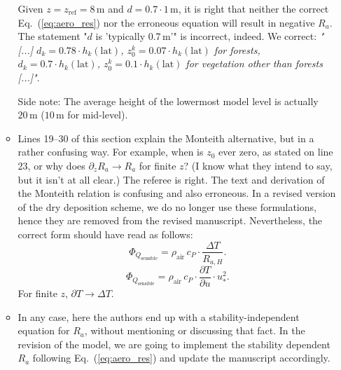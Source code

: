 \begin{itemize}
\begin{itemize}
  Given $z = z_\mathrm{ref} = 8\,\mathrm{m}$ and $d = 0.7\cdot 1\,\mathrm{m}$, it is right that neither the correct Eq.~(\ref{eq:aero_res}) nor the erroneous equation will result in negative $R_a$. The statement "$d$ is ’typically 0.7\,m’" is incorrect, indeed. We correct: \emph{"[...] $d_k=0.78\cdot h_k(\mathrm{lat})$, $z_0^k=0.07\cdot h_k(\mathrm{lat})$ for forests, $d_k=0.7\cdot h_k(\mathrm{lat})$, $z_0^k=0.1\cdot h_k(\mathrm{lat})$ for vegetation other than forests [...]"}.

  Side note: The average height of the lowermost model level is actually $20\,\mathrm{m}$ ($10\,\mathrm{m}$ for mid-level).
  
\item {\color{blue} Lines 19--30 of this section explain the Monteith alternative, but in a rather confusing
way. For example, when is $z_0$ ever zero, as stated on line 23, or why does $\partial_z R_a \rightarrow R_a $
for finite $z$? (I know what they intend to say, but it isn’t at all clear.)}
  The referee is right. The text and derivation of the Monteith relation is confusing and also erroneous. In a revised version of the dry deposition scheme, we do no longer use these formulations, hence they are removed from the revised manuscript. Nevertheless, the correct form should have read as follows: 
\begin{equation}
  \Phi_{Q_\text{sensible}} = \rho_\text{air}\,c_P \cdot \frac{\Delta T}{R_{a, H}}.
  \label{eq:sens_heat}
\end{equation}
\begin{equation}
  \Phi_{Q_\text{sensible}} = \rho_\text{air}\,c_P \cdot \frac{\partial T}{\partial u} \cdot u_*^2.
  \label{eq:eddy_theo}
\end{equation}
For finite $z$, $\partial T \rightarrow \Delta T$.

\item {\color{blue} In any case, here
the authors end up with a stability-independent equation for $R_a$, without mentioning or
discussing that fact.}
  In the revision of the model, we are going to implement the stability dependent $R_a$ following Eq.~(\ref{eq:aero_res}) and update the manuscript accordingly.
  

\end{itemize}
\end{itemize}
